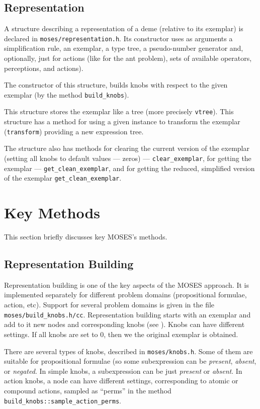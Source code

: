 \documentclass{article}
\begin{document}
\subsection{Representation}

A structure describing a representation of a deme (relative to its
exemplar) is declared 
in \verb|moses/representation.h|. Its constructor uses as arguments
a simplification rule, an exemplar, a type tree, a pseudo-number
generator and, optionally, just for actions (like for the ant problem),
sets of available operators, perceptions, and actions).

The constructor of this structure, builds knobs with respect to the
given exemplar (by the method \verb|build_knobs|).

This structure stores the exemplar like a tree (more precisely \verb|vtree|).
This structure has a method for using a given instance to transform 
the exemplar (\verb|transform|) providing a new expression tree. 

The structure also has methods for clearing the current version of
the exemplar (setting all knobs to default values --- zeros) ---
\verb|clear_exemplar|, for getting the exemplar ---
\verb|get_clean_exemplar|, and for getting the reduced, simplified 
version of the exemplar \verb|get_clean_exemplar|.


\section{Key Methods}

This section briefly discusses key MOSES's methods.

\subsection{Representation Building}

Representation building is one of the key aspects of the MOSES approach. 
It is implemented separately for different problem domains (propositional
formulae, action, etc). Support for several problem domains is given in 
the file \verb|moses/build_knobs.h/cc|. 
Representation building starts with an exemplar and add to it new nodes
and corresponding knobs (see \cite{6}). Knobs can have different settings. 
If all knobs are set to 0, then we the original exemplar is obtained. 

There are several types of knobs, described in \verb|moses/knobs.h|.
Some of them are suitable for propositional formulae (so some subexpression
can be {\em present}, {\em absent}, or {\em negated}. In simple knobs,
a subexpression can be just {\em present} or {\em absent}.
In action knobs, a node can have different settings, corresponding
to atomic or compound actions, sampled as ``perms'' 
in the method \verb|build_knobs::sample_action_perms|.
\end{document}
